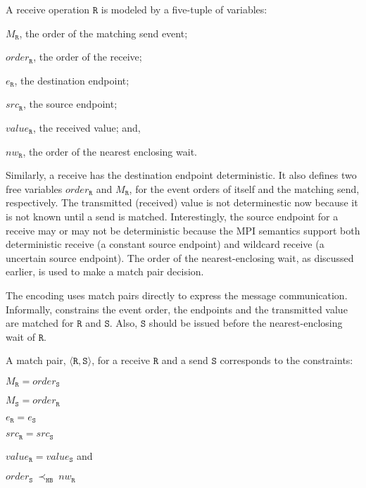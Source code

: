 \begin{definition}[Receive] \label{def:rcv}
A receive operation $\mathtt{R}$ is modeled by a five-tuple of variables:
\begin{compactenum}
\item $M_\mathtt{R}$, the order of the matching send event;
\item $\mathit{order}_\mathtt{R}$, the order of the receive;
\item $e_\mathtt{R}$, the destination endpoint;
\item $src_\mathtt{R}$, the source endpoint;
\item $\mathit{value}_\mathtt{R}$, the received value; and,
\item $\mathit{nw}_\mathtt{R}$, the order of the nearest enclosing wait.
\end{compactenum}
\end{definition}

Similarly, a receive has the destination endpoint deterministic. It also defines two free variables $\mathit{order}_\mathtt{R}$ and $M_\mathtt{R}$, for the event orders of itself and the matching send, respectively. The transmitted (received) value is not determinestic now because it is not known until a send is matched. Interestingly, the source endpoint for a receive may or may not be deterministic because the MPI semantics support both deterministic receive (a constant source endpoint) and wildcard receive (a uncertain source endpoint). The order of the nearest-enclosing wait, as discussed earlier, is used to make a match pair decision. 

The encoding uses match pairs directly to express the message communication. Informally,  constrains the event order, the endpoints and the transmitted value are matched for $\mathtt{R}$ and $\mathtt{S}$. Also, $\mathtt{S}$ should be issued before the nearest-enclosing wait of $\mathtt{R}$. 

\begin{definition} \label{def:match}
A match pair, $\langle\mathtt{R}, \mathtt{S}\rangle$, for a receive
$\mathtt{R}$ and a send $\mathtt{S}$ corresponds to the constraints:
\begin{compactenum}
\item $M_{\mathtt{R}} = \mathit{order}_{\mathtt{S}}$
\item $M_{\mathtt{S}} = \mathit{order}_{\mathtt{R}}$
\item $e_{\mathtt{R}} = e_{\mathtt{S}}$
\item $src_\mathtt{R} = src_\mathtt{S}$
\item $\mathit{value}_{\mathtt{R}} = \mathit{value}_{\mathtt{S}}$ and
\item $\mathit{order}_{\mathtt{S}}\ \mathrm{\prec_\mathtt{HB}}\ \mathit{nw}_{\mathtt{R}}$
\end{compactenum}
\end{definition}

